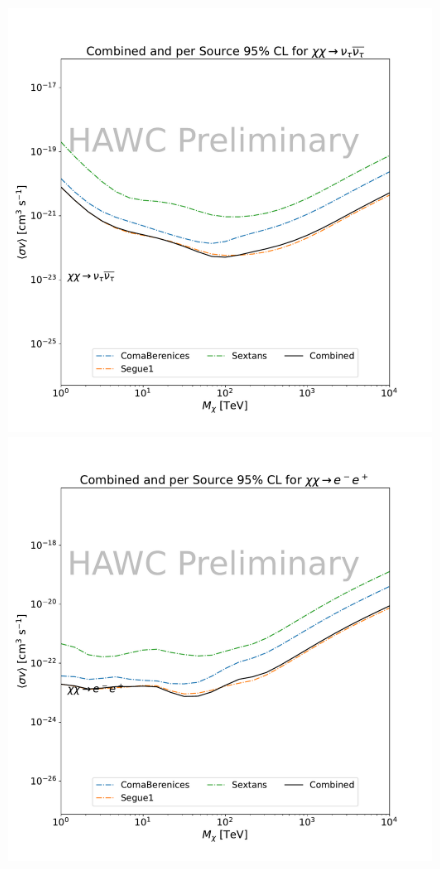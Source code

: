 \begin{figure}[h]
{    \includegraphics[scale=0.21]{figures/mtd_hawc_dm/results/Combined95_New_duck_nutaunutau_.pdf}
    \includegraphics[scale=0.21]{figures/mtd_hawc_dm/results/Combined95_New_duck_ee_.pdf}
}
\end{figure}
